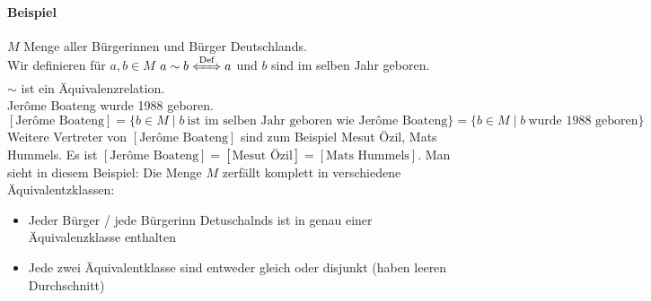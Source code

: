 \documentclass[a4paper]{scrartcl}
\theoremstyle{definition}
\theoremstyle{plain}
\theoremstyle{plain}
\theoremstyle{remark}
\theoremstyle{remark}
\theoremstyle{remark}
\begin{document}
\paragraph{Beispiel}
\label{sec-2-5-6-1}
$M$ Menge aller Bürgerinnen und Bürger Deutschlands. \\
     Wir definieren für $a,b\in M$ $a\sim b \xLeftrightarrow{\text{Def}} a$ und $b$ sind im selben Jahr geboren. \\
     $\sim$ ist ein Äquivalenzrelation. \\
     Jerôme Boateng wurde 1988 geboren. \\
     $[\text{Jerôme Boateng}] = \{b\in M\mid b~\text{ist im selben Jahr geboren wie Jerôme Boateng}\} = \{b\in M\mid b~\text{wurde 1988 geboren}\}$
Weitere Vertreter von $[\text{Jerôme Boateng}]$ sind zum Beispiel Mesut Özil, Mats Hummels.
Es ist $[\text{Jerôme Boateng}] = [\text{Mesut Özil}] = [\text{Mats Hummels}]$.
Man sieht in diesem Beispiel: Die Menge $M$ zerfällt komplett in verschiedene Äquivalentzklassen:
\begin{itemize}
\item Jeder Bürger / jede Bürgerinn Detuschalnds ist in genau einer Äquivalenzklasse enthalten
\item Jede zwei Äquivalentklasse sind entweder gleich oder disjunkt (haben leeren Durchschnitt)
\end{itemize}
\end{document}
